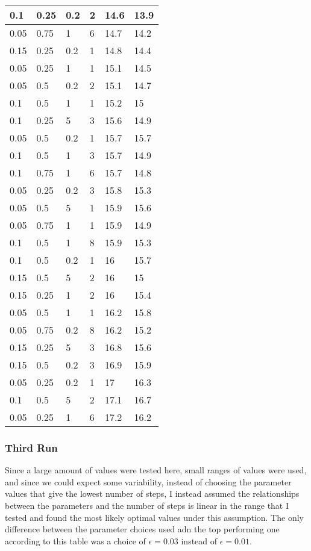 \documentclass{amsart}
\begin{document}
\begin{center}
\begin{longtable}{| l | l | l | l || l | l |}
		0.1&	0.25&	0.2&	2&	14.6&	13.9\\ \hline
		0.05&	0.75&	1&	6&	14.7&	14.2\\ \hline
		0.15&	0.25&	0.2&	1&	14.8&	14.4\\ \hline
		0.05&	0.25&	1&	1&	15.1&	14.5\\ \hline
		0.05&	0.5&	0.2&	2&	15.1&	14.7\\ \hline
		0.1&	0.5&	1&	1&	15.2&	15\\ \hline
		0.1&	0.25&	5&	3&	15.6&	14.9\\ \hline
		0.05&	0.5&	0.2&	1&	15.7&	15.7\\ \hline
		0.1&	0.5&	1&	3&	15.7&	14.9\\ \hline
		0.1&	0.75&	1&	6&	15.7&	14.8\\ \hline
		0.05&	0.25&	0.2&	3&	15.8&	15.3\\ \hline
		0.05&	0.5&	5&	1&	15.9&	15.6\\ \hline
		0.05&	0.75&	1&	1&	15.9&	14.9\\ \hline
		0.1&	0.5&	1&	8&	15.9&	15.3\\ \hline
		0.1&	0.5&	0.2&	1&	16&	15.7\\ \hline
		0.15&	0.5&	5&	2&	16&	15\\ \hline
		0.15&	0.25&	1&	2&	16&	15.4\\ \hline
		0.05&	0.5&	1&	1&	16.2&	15.8\\ \hline
		0.05&	0.75&	0.2&	8&	16.2&	15.2\\ \hline
		0.15&	0.25&	5&	3&	16.8&	15.6\\ \hline
		0.15&	0.5&	0.2&	3&	16.9&	15.9\\ \hline
		0.05&	0.25&	0.2&	1&	17&	16.3\\ \hline
		0.1&	0.5&	5&	2&	17.1&	16.7\\ \hline
		0.05&	0.25&	1&	6&	17.2&	16.2\\ \hline
	\end{longtable}
\end{center}
\subsubsection{Third Run}

Since a large amount of values were tested here, small ranges of values were used, and since we could expect some variability, instead of choosing the parameter values that
give the lowest number of steps, I instead assumed the relationships between the parameters and the number of steps is linear in the range that I tested and found the most likely
optimal values under this assumption.  The only difference between the parameter choices used adn the top performing one according to this table was a choice of $\epsilon = 0.03$ instead of $\epsilon = 0.01$.
\end{document}
